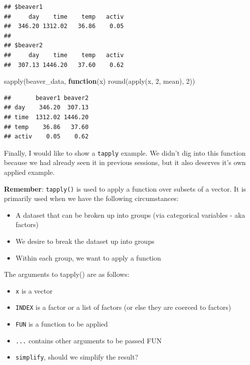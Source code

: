 \documentclass[
]{book}
\newenvironment{Shaded}{\begin{snugshade}}{\end{snugshade}}
\newcommand{\ControlFlowTok}[1]{\textcolor[rgb]{0.13,0.29,0.53}{\textbf{#1}}}
\newcommand{\DecValTok}[1]{\textcolor[rgb]{0.00,0.00,0.81}{#1}}
\newcommand{\FunctionTok}[1]{\textcolor[rgb]{0.00,0.00,0.00}{#1}}
\newcommand{\NormalTok}[1]{#1}
\providecommand{\tightlist}{%
  \setlength{\itemsep}{0pt}\setlength{\parskip}{0pt}}
\begin{document}
\begin{verbatim}
## $beaver1
##     day    time    temp   activ 
##  346.20 1312.02   36.86    0.05 
## 
## $beaver2
##     day    time    temp   activ 
##  307.13 1446.20   37.60    0.62
\end{verbatim}

\begin{Shaded}
\begin{Highlighting}[]
\FunctionTok{sapply}\NormalTok{(beaver\_data, }\ControlFlowTok{function}\NormalTok{(x) }\FunctionTok{round}\NormalTok{(}\FunctionTok{apply}\NormalTok{(x, }\DecValTok{2}\NormalTok{, mean), }\DecValTok{2}\NormalTok{))}
\end{Highlighting}
\end{Shaded}

\begin{verbatim}
##       beaver1 beaver2
## day    346.20  307.13
## time  1312.02 1446.20
## temp    36.86   37.60
## activ    0.05    0.62
\end{verbatim}

Finally, I would like to show a \texttt{tapply} example. We didn't dig into this function because we had already seen it in previous sessions, but it also deserves it's own applied example.

\textbf{Remember}: \texttt{tapply()} is used to apply a function over subsets of a vector. It is primarily used when we have the following circumstances:

\begin{itemize}
\tightlist
\item
  A dataset that can be broken up into groups (via categorical variables - aka factors)
\item
  We desire to break the dataset up into groups
\item
  Within each group, we want to apply a function
\end{itemize}

The arguments to tapply() are as follows:

\begin{itemize}
\tightlist
\item
  \texttt{x} is a vector
\item
  \texttt{INDEX} is a factor or a list of factors (or else they are coerced to factors)
\item
  \texttt{FUN} is a function to be applied
\item
  \texttt{...} contains other arguments to be passed FUN
\item
  \texttt{simplify}, should we simplify the result?
\end{itemize}
\end{document}

